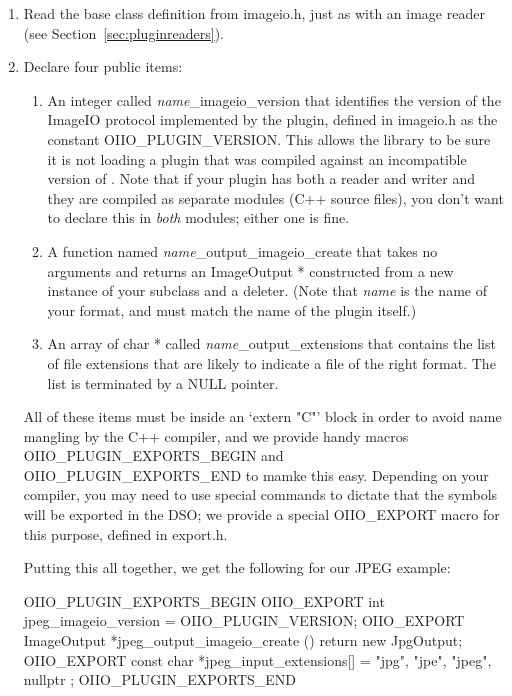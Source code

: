 \begin{enumerate}
\item Read the base class definition from {\fn imageio.h}, just as
  with an image reader (see Section~\ref{sec:pluginreaders}).

\item Declare four public items:

  \begin{enumerate}
    \item An integer called \emph{name}{\cf _imageio_version} that identifies
      the version of the ImageIO protocol implemented by the plugin,
      defined in {\fn imageio.h} as the constant {\cf OIIO_PLUGIN_VERSION}.
      This allows the library to be sure it is not loading a plugin
      that was compiled against an incompatible version of \product.
      Note that if your plugin has both a reader and writer and they
      are compiled as separate modules (C++ source files), you don't
      want to declare this in \emph{both} modules; either one is fine.
    \item A function named \emph{name}{\cf _output_imageio_create} that
      takes no arguments and returns an {\cf ImageOutput *}
      constructed from a new instance of your \ImageOutput subclass and a
      deleter.  (Note that \emph{name} is the name of your format,
      and must match the name of the plugin itself.)
    \item An array of {\cf char *} called \emph{name}{\cf _output_extensions}
      that contains the list of file extensions that are likely to indicate
      a file of the right format.  The list is terminated by a {\cf NULL}
      pointer.
  \end{enumerate}

  All of these items must be inside an `{\cf extern "C"}' block in order
  to avoid name mangling by the C++ compiler, and we provide handy
  macros {\cf OIIO_PLUGIN_EXPORTS_BEGIN} and {\cf OIIO_PLUGIN_EXPORTS_END}
  to mamke this easy.  Depending on your
  compiler, you may need to use special commands to dictate that the
  symbols will be exported in the DSO; we provide a special {\cf
  OIIO_EXPORT} macro for this purpose, defined in {\fn export.h}.

  Putting this all together, we get the following for our JPEG example:

  \begin{code}
    OIIO_PLUGIN_EXPORTS_BEGIN
        OIIO_EXPORT int jpeg_imageio_version = OIIO_PLUGIN_VERSION;
        OIIO_EXPORT ImageOutput *jpeg_output_imageio_create () {
            return new JpgOutput;
        }
        OIIO_EXPORT const char *jpeg_input_extensions[] = {
            "jpg", "jpe", "jpeg", nullptr
        };
    OIIO_PLUGIN_EXPORTS_END
  \end{code}


\end{enumerate}
